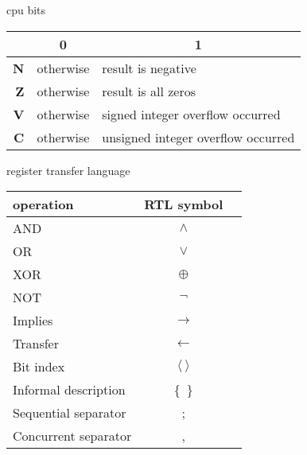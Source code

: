 \documentclass[10pt,t,svgnames]{beamer}
\begin{document}
  \begin{frame}{cpu bits}
    \renewcommand{\arraystretch}{2}
    \begin{center}
      \begin{tabular}{r|l|l}
        & \multicolumn{1}{c|}{\textbf{0}} & \multicolumn{1}{c}{\textbf{1}}\\
        \hline
        \textbf{N} & otherwise & result is negative\\
        \textbf{Z} & otherwise & result is all zeros\\
        \textbf{V} & otherwise & signed integer overflow occurred\\
        \textbf{C} & otherwise & unsigned integer overflow occurred\\
      \end{tabular}
    \end{center}

  \end{frame}

  \begin{frame}{register transfer language}
    \begin{center}
      \begin{tabular}{l|c|l}
        operation & RTL symbol\\
        \hline
        AND                  & $\wedge$\\
        OR                   & $\vee$\\
        XOR                  & $\oplus$\\
        NOT                  & $\neg$\\
        Implies              & $\rightarrow$\\
        Transfer             & $\leftarrow$\\
        Bit index            & $\langle~\rangle$\\
        Informal description & \{~\}\\
        Sequential separator & ;\\
        Concurrent separator & ,\\
      \end{tabular}

      \vspace{\baselineskip}


    \end{center}
  \end{frame}
\end{document}
